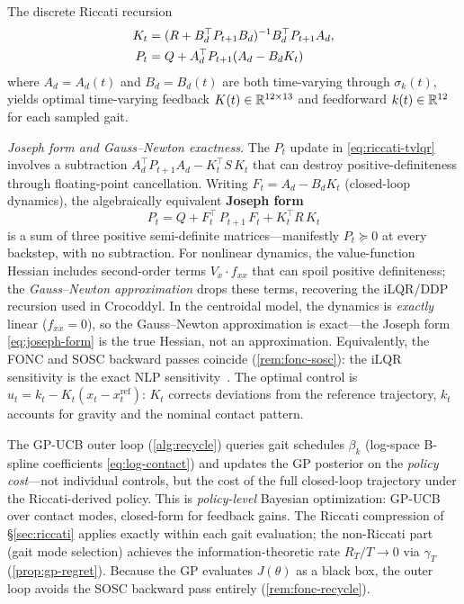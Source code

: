 The discrete Riccati recursion
\begin{align}\label{eq:riccati-tvlqr}
K_t &= (R + B_d^\top P_{t+1} B_d)^{-1} B_d^\top P_{t+1} A_d,
\notag\\
P_t &= Q + A_d^\top P_{t+1}(A_d - B_d K_t)
\end{align}
where $A_d = A_d(t)$ and $B_d = B_d(t)$ are both time-varying through
$\sigma_k(t)$,
yields optimal time-varying feedback $K(t) \in \mathbb{R}^{12 \times 13}$ and
feedforward $k(t) \in \mathbb{R}^{12}$ for each sampled gait.

\smallskip\noindent\emph{Joseph form and Gauss--Newton exactness.}
The $P_t$ update in \eqref{eq:riccati-tvlqr} involves a subtraction
$A_d^\top P_{t+1} A_d - K_t^\top S\, K_t$ that can destroy
positive-definiteness through floating-point cancellation.
Writing $F_t = A_d - B_d K_t$ (closed-loop dynamics), the algebraically
equivalent \textbf{Joseph form} \cite{BucyJoseph}
\begin{equation}\label{eq:joseph-form}
P_t = Q + F_t^\top\, P_{t+1}\, F_t + K_t^\top R\, K_t
\end{equation}
is a sum of three positive semi-definite matrices---manifestly
$P_t \succeq 0$ at every backstep, with no subtraction.
For nonlinear dynamics, the value-function Hessian includes
second-order terms $V_x \cdot f_{xx}$ that can spoil positive
definiteness; the \emph{Gauss--Newton approximation}
\cite{TassaErezTodorov,MastalliCrocoddyl} drops these terms,
recovering the iLQR/DDP recursion used in Crocoddyl.
In the centroidal model, the dynamics is \emph{exactly} linear
($f_{xx} = 0$), so the Gauss--Newton approximation is
exact---the Joseph form \eqref{eq:joseph-form} is the true
Hessian, not an approximation.
Equivalently, the FONC and SOSC backward passes coincide
(\cref{rem:fonc-sosc}): the iLQR sensitivity is the
exact NLP sensitivity~\cite{FreyDiffMPC}.
The optimal control is $u_t = k_t - K_t(x_t - x_t^{\mathrm{ref}})$:
$K_t$ corrects deviations from the reference trajectory, $k_t$ accounts
for gravity and the nominal contact pattern.

The GP-UCB outer loop (\cref{alg:recycle}) queries gait schedules
$\beta_k$ (log-space B-spline coefficients \eqref{eq:log-contact})
and updates the GP posterior on the \emph{policy cost}---not individual
controls, but the cost of the full closed-loop trajectory under the
Riccati-derived policy.
This is \emph{policy-level} Bayesian optimization: GP-UCB over contact
modes, closed-form for feedback gains.
The Riccati compression of \S\ref{sec:riccati} applies exactly within
each gait evaluation; the non-Riccati part (gait mode selection) achieves
the information-theoretic rate $R_T/T \to 0$ via $\gamma_T$
(\cref{prop:gp-regret}).
Because the GP evaluates $J(\theta)$ as a black box, the outer
loop avoids the SOSC backward pass entirely
(\cref{rem:fonc-recycle}).

